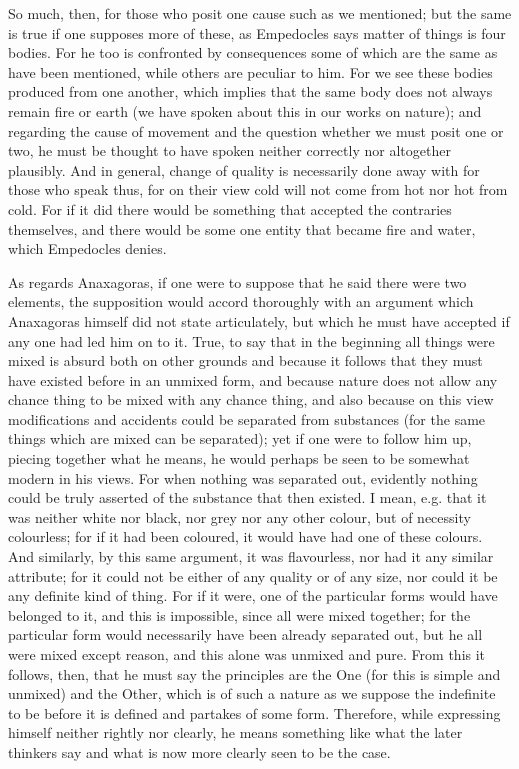 \documentclass[oneside, 17pt, dvipsnames]{extbook}
\begin{document}
So much, then, for those who posit one cause such as we mentioned; but the same is true if one supposes more of these, as Empedocles says matter of things is four bodies. For he too is confronted by consequences some of which are the same as have been mentioned, while others are peculiar to him. For we see these bodies produced from one another, which implies that the same body does not always remain fire or earth (we have spoken about this in our works on nature); and regarding the cause of movement and the question whether we must posit one or two, he must be thought to have spoken neither correctly nor altogether plausibly. And in general, change of quality is necessarily done away with for those who speak thus, for on their view cold will not come from hot nor hot from cold. For if it did there would be something that accepted the contraries themselves, and there would be some one entity that became fire and water, which Empedocles denies.

As regards Anaxagoras, if one were to suppose that he said there were two elements, the supposition would accord thoroughly with an argument which Anaxagoras himself did not state articulately, but which he must have accepted if any one had led him on to it. True, to say that in the beginning all things were mixed is absurd both on other grounds and because it follows that they must have existed before in an unmixed form, and because nature does not allow any chance thing to be mixed with any chance thing, and also because on this view modifications and accidents could be separated from substances (for the same things which are mixed can be separated); yet if one were to follow him up, piecing together what he means, he would perhaps be seen to be somewhat modern in his views. For when nothing was separated out, evidently nothing could be truly asserted of the substance that then existed. I mean, e.g. that it was neither white nor black, nor grey nor any other colour, but of necessity colourless; for if it had been coloured, it would have had one of these colours. And similarly, by this same argument, it was flavourless, nor had it any similar attribute; for it could not be either of any quality or of any size, nor could it be any definite kind of thing. For if it were, one of the particular forms would have belonged to it, and this is impossible, since all were mixed together; for the particular form would necessarily have been already separated out, but he all were mixed except reason, and this alone was unmixed and pure. From this it follows, then, that he must say the principles are the One (for this is simple and unmixed) and the Other, which is of such a nature as we suppose the indefinite to be before it is defined and partakes of some form. Therefore, while expressing himself neither rightly nor clearly, he means something like what the later thinkers say and what is now more clearly seen to be the case.
\end{document}
